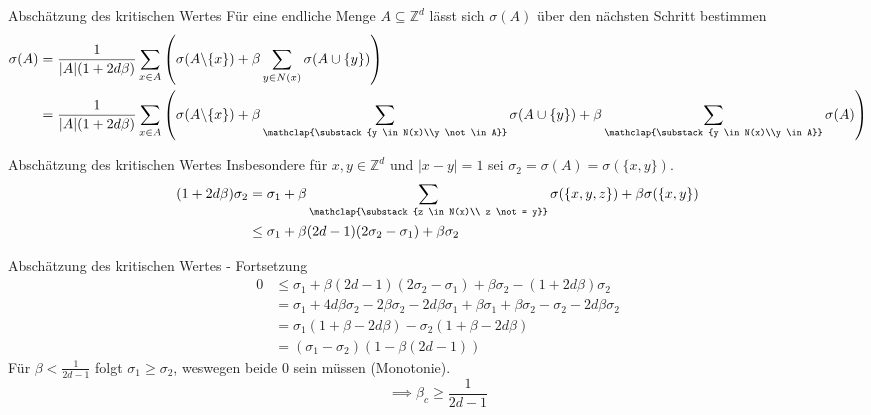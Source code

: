 \documentclass[11pt]{beamer}
\begin{document}
\begin{frame}{Absch\"atzung des kritischen Wertes}
    F\"ur eine endliche Menge $A \subseteq \mathbb{Z}^d$ l\"asst sich $\sigma(A)$ \"uber den n\"achsten
    Schritt bestimmen
    \begin{align*}
        \sigma(A) &= \frac{1}{|A|(1 + 2d \beta)}\sum_{x \in A} \left( \sigma(A \backslash \{ x \})
                   + \beta \sum_{y \in N(x)} \sigma(A \cup \{ y \}) \right) \\
                  &= \frac{1}{|A|(1 + 2d \beta)} \sum_{x \in A} \left( \sigma(A \backslash \{ x \})
                   + \beta \sum_{\mathclap{\substack{y \in N(x)\\y \not\in A}}} \sigma(A \cup \{ y \}) 
                   + \beta \sum_{\mathclap{\substack{y \in N(x)\\y \in A}}}\sigma(A) \right)
    \end{align*}
\end{frame}
\begin{frame}{Absch\"atzung des kritischen Wertes}
    Insbesondere f\"ur $x, y \in \mathbb{Z}^d$ und $|x - y| = 1$ sei $\sigma_2 = \sigma(A) = \sigma(\{ x, y \})$.
    \begin{align*}
        (1 + 2d\beta)\sigma_2 &= \sigma_1
                               + \beta \sum_{\mathclap{\substack{z \in N(x)\\ z \not = y}}} \sigma(\{ x, y, z \})
                               + \beta \sigma(\{ x, y \}) \\
                              &\leq \sigma_1 + \beta (2d - 1) (2 \sigma_2 - \sigma_1)
                               + \beta \sigma_2 
    \end{align*}
\end{frame}

\begin{frame}{Absch\"atzung des kritischen Wertes - Fortsetzung}
    \begin{align*}
        0 &\leq \sigma_1 + \beta (2d - 1) (2 \sigma_2 - \sigma_1) + \beta \sigma_2 -  (1 + 2d\beta)\sigma_2 \\
          &= \sigma_1 + 4d \beta \sigma_2 - 2 \beta \sigma_2 - 2d \beta \sigma_1 + \beta \sigma_1 + \beta \sigma_2
           - \sigma_2 - 2d \beta \sigma_2 \\
          &= \sigma_1 (1 + \beta - 2d\beta) - \sigma_2 (1 + \beta - 2d \beta) \\
          &= (\sigma_1 - \sigma_2)(1 - \beta(2d - 1))
    \end{align*}
    Für $\beta < \frac{1}{2d - 1}$ folgt $\sigma_1 \geq \sigma_2$, weswegen beide $0$ sein m\"ussen (Monotonie).
    \begin{equation*}
        \implies \beta_c \geq \frac{1}{2d - 1} 
    \end{equation*}
\end{frame}
\end{document}
